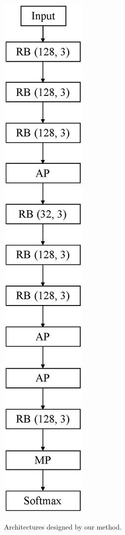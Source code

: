 \begin{figure}[!t]
\begin{minipage}[b]{0.45\linewidth}
  \includegraphics[keepaspectratio, scale=0.4]{images/modelB.eps}
  \label{modelB}
 \end{minipage}
 \caption{Architectures designed by our method.}\label{models}
\end{figure}

